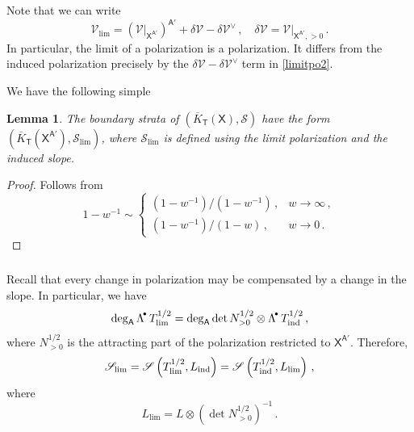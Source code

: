 \documentclass[14pt]{extarticle}
\newcommand{\bT}{\mathsf{T}}
\newcommand{\bA}{\mathsf{A}}
\newcommand{\bX}{\mathsf{X}}
\newcommand{\cV}{\mathscr{V}}
\newcommand{\cS}{\mathscr{S}}
\newcommand{\Ld}{{\Lambda}^{\!\raisebox{0.5mm}{$\scriptscriptstyle
      \bullet$}}\!}
\newtheorem{Lemma}{Lemma}[section]
\theoremstyle{definition}
\newcommand{\Kbar}{\overline{K}}
\begin{document}
\noindent
Note that we can write
\begin{equation}
  \label{limitpo2}
  \cV_{\lim}= \left(\cV\big|_{\bX^{\bA'}} \right)^{\bA'} 
    + \delta \cV - \delta \cV^\vee \,, \quad
 \delta \cV = \cV\big|_{\bX^{\bA'}, >0} \,. 
\end{equation}
%
In particular, the limit of a polarization is a polarization. It 
differs from the induced polarization precisely by the $\delta \cV - \delta \cV^\vee$  term
in \eqref{limitpo2}.

We have the following simple 

\begin{Lemma}\label{l_lim} 
 The boundary strata of $(\Kbar_\bT(\bX),\cS)$ have the form
 $(\Kbar_\bT(\bX^{\bA'}),\cS_{\lim})$, where $\cS_{\lim}$ is defined using
 the limit polarization and the induced slope. 
\end{Lemma}

\begin{proof}
  Follows from 
  $$
  1 - w^{-1} \sim
  \begin{cases}
    (1-w^{-1}) \big/ (1-w^{-1})  \,, & w\to \infty \,, \\
    (1-w^{-1}) \big/ (1-w) \,, & w\to 0 \,.
  \end{cases}
  $$
\end{proof}


\subsubsection{}

Recall that every change in polarization may be compensated by a
change in the slope. In particular, we have 
%
\begin{equation}
  \label{Ldplim}
  \deg _\bA \Ld \,\,  T^{1/2}_{\lim} = \deg_\bA \det N^{1/2}_{>0}  \otimes \Ld \, \, 
  T^{1/2}_\textup{ind} \,, 
\end{equation}
%
where  $N^{1/2}_{>0}$ is the attracting part of the
polarization restricted to $\bX^{\bA'}$. Therefore, 
$$
\cS_{\lim} = \cS\left(T^{1/2}_{\lim}, L_\textup{ind}\right)=
\cS\left(T^{1/2}_\textup{ind}, L_{\lim}\right) \,, 
$$
where
$$
L_{\lim} = L \otimes (\det
N^{1/2}_{>0})^{-1}  \,.
$$





\subsubsection{}
\end{document}

